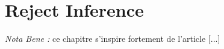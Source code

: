 \chapter{Reject Inference} \label{chap2}


\textit{Nota Bene :} ce chapitre s'inspire fortement de l'article [...]

\section{}